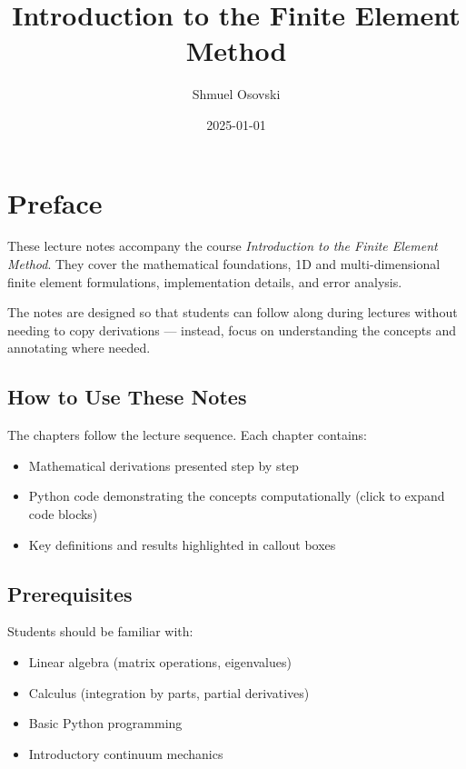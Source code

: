 \documentclass[
  11pt,
  a4paper,
]{scrbook}
\title{Introduction to the Finite Element Method}
\author{Shmuel Osovski}
\date{2025-01-01}
\providecommand{\tightlist}{%
  \setlength{\itemsep}{0pt}\setlength{\parskip}{0pt}}\usepackage{longtable,booktabs,array}
\renewcommand*\contentsname{Table of contents}
\newcommand\contentsname{Table of contents}
\begin{document}
\frontmatter
\maketitle

\renewcommand*\contentsname{Table of contents}
{
\setcounter{tocdepth}{1}
\tableofcontents
}

\mainmatter
{}

\chapter{Preface}\label{preface}

These lecture notes accompany the course \emph{Introduction to the
Finite Element Method}. They cover the mathematical foundations, 1D and
multi-dimensional finite element formulations, implementation details,
and error analysis.

The notes are designed so that students can follow along during lectures
without needing to copy derivations --- instead, focus on understanding
the concepts and annotating where needed.

\section{How to Use These Notes}\label{how-to-use-these-notes}

The chapters follow the lecture sequence. Each chapter contains:

\begin{itemize}
\tightlist
\item
  Mathematical derivations presented step by step
\item
  Python code demonstrating the concepts computationally (click to
  expand code blocks)
\item
  Key definitions and results highlighted in callout boxes
\end{itemize}

\section{Prerequisites}\label{prerequisites}

Students should be familiar with:

\begin{itemize}
\tightlist
\item
  Linear algebra (matrix operations, eigenvalues)
\item
  Calculus (integration by parts, partial derivatives)
\item
  Basic Python programming
\item
  Introductory continuum mechanics
\end{itemize}
\end{document}
